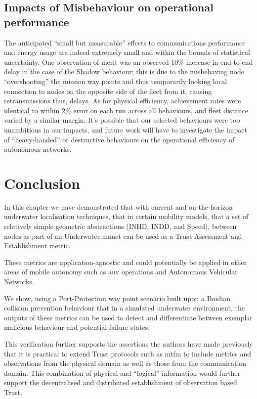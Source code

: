 \subsection{Impacts of Misbehaviour on operational performance}
The anticipated ``small but measurable'' effects to communications performance and energy usage are indeed extremely small and within the bounds of statistical uncertainty.
One observation of merit was an observed 10\% increase in end-to-end delay in the case of the Shadow behaviour; this is due to the misbehaving node ``overshooting'' the mission way points and thus temporarily looking local connection to nodes on the opposite side of the fleet from it, causing retransmissions thus, delays.
As for physical efficiency, achievement rates were identical to within 2\% error on each run across all behaviours, and fleet distance varied by a similar margin.
It's possible that our selected behaviours were too unambitious in our impacts, and future work will have to investigate the impact of ``heavy-handed'' or destructive behaviours on the operational efficiency of autonomous networks.

\section{Conclusion}
In this chapter we have demonstrated that with current and on-the-horizon underwater localisation techniques, that in certain mobility models, that a set of relatively simple geometric abstractions (INHD, INDD, and Speed), between nodes as part of an Underwater \gls{manet} can be used as a Trust Assessment and Establishment metric.

These metrics are application-agnostic and could potentially be applied in other areas of mobile autonomy such as \gls{auv} operations and Autonomous Vehicular Networks.

We show, using a Port-Protection way point scenario built upon a Boidian collision prevention behaviour that in a simulated underwater environment, the outputs of these metrics can be used to detect and differentiate between exemplar malicious behaviour and potential failure states.

This verification further supports the assertions the authors have made previously that it is practical to extend Trust protocols such as \gls{mtfm} \cite{Guo2012} to include metrics and observations from the physical domain as well as those from the communication domain\cite{Bolster2014}.
This combination of physical and ``logical'' information would further support the decentralised and distributed establishment of observation based Trust.


